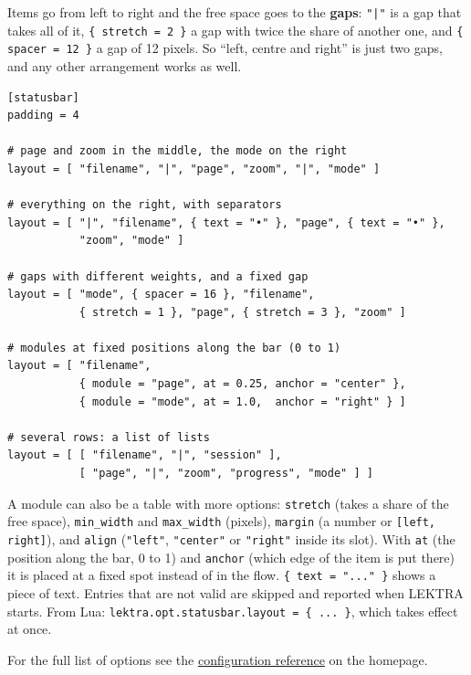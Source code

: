 \documentclass[a4paper,12pt]{article}
\begin{document}
Items go from left to right and the free space goes to the \textbf{gaps}: \texttt{"|"} is a gap that takes all of it, \texttt{\{ stretch = 2 \}} a gap with twice the share of another one, and \texttt{\{ spacer = 12 \}} a gap of 12 pixels. So ``left, centre and right'' is just two gaps, and any other arrangement works as well.

\begin{tcolorbox}[colback=gray!5, colframe=gray!40, boxrule=0.4pt, arc=4pt,
    fontupper=\ttfamily\small]
\begin{verbatim}
[statusbar]
padding = 4

# page and zoom in the middle, the mode on the right
layout = [ "filename", "|", "page", "zoom", "|", "mode" ]

# everything on the right, with separators
layout = [ "|", "filename", { text = "•" }, "page", { text = "•" },
           "zoom", "mode" ]

# gaps with different weights, and a fixed gap
layout = [ "mode", { spacer = 16 }, "filename",
           { stretch = 1 }, "page", { stretch = 3 }, "zoom" ]

# modules at fixed positions along the bar (0 to 1)
layout = [ "filename",
           { module = "page", at = 0.25, anchor = "center" },
           { module = "mode", at = 1.0,  anchor = "right" } ]

# several rows: a list of lists
layout = [ [ "filename", "|", "session" ],
           [ "page", "|", "zoom", "progress", "mode" ] ]
\end{verbatim}
\end{tcolorbox}

A module can also be a table with more options: \texttt{stretch} (takes a share of the free space), \texttt{min\_\allowbreak{}width} and \texttt{max\_\allowbreak{}width} (pixels), \texttt{margin} (a number or \texttt{[left, right]}), and \texttt{align} (\texttt{"left"}, \texttt{"center"} or \texttt{"right"} inside its slot). With \texttt{at} (the position along the bar, 0 to 1) and \texttt{anchor} (which edge of the item is put there) it is placed at a fixed spot instead of in the flow. \texttt{\{ text = "..." \}} shows a piece of text. Entries that are not valid are skipped and reported when LEKTRA starts. From Lua: \texttt{lektra.opt.statusbar.layout = \{ ... \}}, which takes effect at once.

For the full list of options see the \href{https://lektra.readthedocs.io/en/latest/reference/toml_configuration/}{configuration reference} on the homepage.
\end{document}

